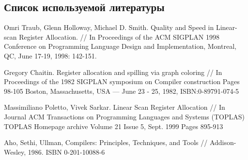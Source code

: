 \subsection{ Список используемой литературы}
\begin{my_enumerate}

\item
Omri Traub, Glenn Holloway, Michael D. Smith. Quality and Speed in Linear-scan Register Allocation. // In Proceedings of the ACM SIGPLAN 1998 Conference on Programming Language Design and Implementation, Montreal, QC, June 17-19, 1998: 142-151. \\

\item
Gregory Chaitin. Register allocation and spilling via graph coloring // In Proceedings of the 1982 SIGPLAN symposium on Compiler construction Pages 98-105  Boston, Massachusetts, USA — June 23 - 25, 1982, ISBN:0-89791-074-5 \\

\item 	Massimiliano Poletto, Vivek Sarkar. Linear Scan Register Allocation // In Journal
ACM Transactions on Programming Languages and Systems (TOPLAS) TOPLAS Homepage archive
Volume 21 Issue 5, Sept. 1999 Pages 895-913 \\

\item
Aho, Sethi, Ullman, Compilers: Principles, Techniques, and Tools // Addison-Wesley, 1986. ISBN 0-201-10088-6

\end{my_enumerate}

